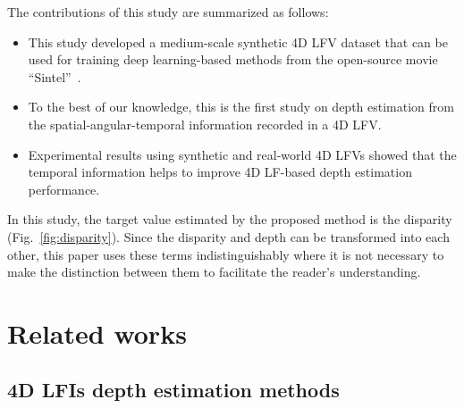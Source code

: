 \documentclass[]{spie}
\newcommand{\jtextd}[1]{}
\begin{document}
The contributions of this study are summarized as follows:
\begin{itemize}

\item This study developed a medium-scale synthetic 4D LFV dataset that 
   can be used for training deep learning-based methods from
the open-source movie ``Sintel''~\cite{sintel2010}.


\item To the best of our knowledge, this is the first study on depth estimation from
  the spatial-angular-temporal information recorded in a 4D LFV.


\item Experimental results using synthetic and real-world 4D LFVs 
   showed that the temporal information helps to improve
   4D LF-based depth estimation performance.


\end{itemize}


\jtextd{
  なお，
  提案手法が推定する値は視差であるが（図~\ref{fig:disparity}），
  視差と奥行きは相互に変換が可能である．
  よって，本論文では，読者の理解を容易にするために，
  視差と奥行きの区別が不要な箇所では，これらの言葉を区別なく用いる．
視差と奥行きを厳密に区別する必要がある箇所では，これらの言葉を区別して議論を行う．
}

In this study, the target value estimated by the proposed method is
the disparity (Fig.~\ref{fig:disparity}).
Since the disparity and depth can be transformed into each other,
this paper uses these terms indistinguishably where it is not necessary to make
the distinction between them
to facilitate the reader's understanding.


\section{Related works}
\subsection{4D LFIs depth estimation methods}
\jtextd{
   近年，深層学習に基づく4D LFIs奥行き推定手法が数多く提案され，大きな成果を上げている．
   これらの手法は，従来の最適化に基づく手法~\cite{tao2013depth,zhang2016robust}
と比較して，精度の向上と計算時間の短縮を実現している．
   Heberら~\cite{heber2016convolutional}はEPIsに含まれる線の傾きを予測するために
   畳み込みニューラルネットワーク（Convolutional Neural Network: CNN）を学習し，
   高次正則化を用いて推定結果を精緻化する手法を提案した．
   Heberら~\cite{heber2017neural}は，U字型エンコーダデコーダ構造のネットワークを用いて
   LFIsから幾何学的情報を抽出し，低計算コストで高品質な奥行きマップを生成することに成功した．
   Shinら~\cite{shin2018epinet}は，完全畳み込みアーキテクチャを用いて高速かつ正確な奥行き推定を行った．
   この研究では，4つの角度方向（水平，垂直，左斜め，右斜め）に
   スタックした
   サブアパーチャー画像を入力とするマルチストリーム構造を導入している．
   Faluv{\'e}giら~\cite{faluvegi20193d}は同様のアーキテクチャにおいて各ストリームで
   3次元畳み込みを使用することで，2つの角度方向スライス（水平，垂直）のみを使用した場合でも
   同等の性能を持つことを示した．
}
\end{document}
